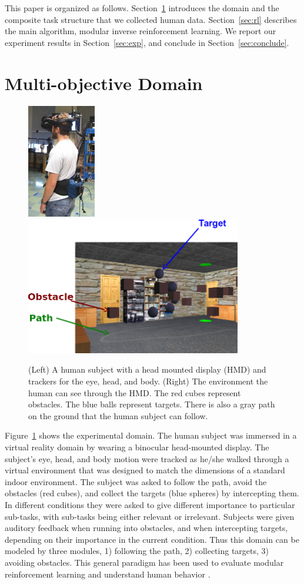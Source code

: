 \documentclass[11pt]{article} %
\begin{document}
This paper is organized as follows. Section~\ref{sec:domain} introduces the
domain and the composite task structure that we collected human data. Section~\ref{sec:rl}
describes the main algorithm, modular inverse reinforcement learning. We report
our experiment results in Section~\ref{sec:exp}, and conclude in
Section~\ref{sec:conclude}.

\section{Multi-objective Domain}
\label{sec:domain}

\begin{figure}
\centering
\includegraphics[height=5cm]{human.jpg}
\includegraphics[height=6cm]{env.png}
\caption{(Left) A human subject with a head mounted display (HMD) and trackers
for the eye, head, and body.  (Right) The environment the human can see through
the HMD.  The red cubes represent obstacles. The blue balls represent targets.
There is also a gray path on the ground that the human subject can follow.}
\label{fig:avatar}
\end{figure}

Figure~\ref{fig:avatar} shows the experimental domain. The
human subject was immersed in a virtual reality domain by wearing a binocular head-mounted display.
The subject's eye, head, and body motion were tracked as he/she walked through a
virtual environment that was designed to match the dimensions of a standard indoor
environment. The subject was asked to follow the path, avoid the obstacles (red
cubes), and collect the targets (blue spheres) by intercepting them. In
different conditions they were asked to give different importance to particular
sub-tasks, with sub-tasks being either relevant or irrelevant. Subjects were
given auditory feedback when running into obstacles, and when intercepting
targets, depending on their importance in the current condition. Thus this
domain can be modeled by three modules, 1) following the path, 2) collecting targets, 3)
avoiding obstacles.  This general paradigm has been used to evaluate modular
reinforcement learning \cite{rothkopf2013modular} and understand human behavior
\cite{Tong2014}.
\end{document}
